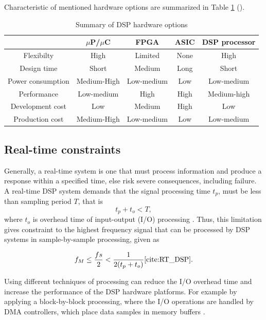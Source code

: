 \documentclass[twoside]{ctuthesis}
\theoremstyle{plain}
\theoremstyle{definition}
\theoremstyle{note}
\begin{document}
Characteristic of mentioned hardware options are summarized in Table \ref{tab:hardwareOptions} (\cite{cite:RT_DSP}).
\begin{table}[htbp]
	\centering
	\caption{Summary of DSP hardware options \cite{cite:RT_DSP}}
	\begin{tabular}{c|cccc}
		\toprule
		    & $\mu$P/$\mu$C & FPGA & ASIC & DSP processor  \\
		\midrule
		Flexibilty & High  & Limited 					& None & High   \\
		Design time & Short  & Medium 					& Long & Short    \\
		Power consumption & Medium-High  & Low-medium   & Low & Low-medium   \\
		Performance & Low-medium  & High				& High & Medium-high  \\
		Development cost & Low  & Medium   				& High & Low  \\
		Production cost & Medium-High  & Low-medium   	& Low & Low-medium \\
		\bottomrule
	\end{tabular}%
	\label{tab:hardwareOptions}%
\end{table}%

\subsection{Real-time constraints}
\label{R-T constrains}
Generally, a real-time system is one that must process information and produce a response within a specified time, else risk severe consequences, including failure. A real-time DSP system demands that the signal processing time $t_{p}$, must be less than sampling period $T$, that is
\begin{equation} \label{eq:hardRealTime1}
	t_{p}+t_{o}<T,
\end{equation}
where $t_{o}$ is overhead time of input-output (I/O) processing \cite{cite:RT_DSP}.
Thus, this limitation gives constraint to the highest frequency signal that can be processed by DSP systems in sample-by-sample processing, given as

\begin{equation} \label{eq:hardRealTime2}
	f_{M} \leq \frac{fs}{2} < \frac{1}{2(t_{p}+t_{o})} \cite{cite:RT_DSP}.
\end{equation}

Using different techniques of processing can reduce the I/O overhead time and increase the performance of the DSP hardware platforms. For example by applying a block-by-block processing, where the I/O operations are handled by DMA controllers, which place data samples in memory buffers \cite{cite:RT_DSP}.
\end{document}
